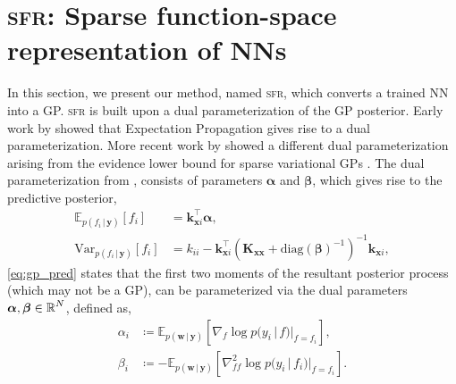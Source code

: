 \documentclass{article}
\renewcommand{\paragraph}[1]{{\bf #1}~~}
\newcommand{\our}{\textsc{sfr}\xspace}
\newcommand{\mathbold}[1]{\bm{#1}}
\newcommand{\mbf}[1]{\mathbf{#1}}
\renewcommand{\mid}{\,|\,}
\newcommand{\valpha}[0]{\mathbold{\alpha}}
\newcommand{\vbeta}[0]{\mathbold{\beta}}
\newcommand{\diag}{\text{{diag}}}
\newcommand{\vx}{\mbf{x}}
\newcommand{\vy}{\mbf{y}}
\newcommand{\vw}{\mbf{w}}
\newcommand{\MKxx}{\mbf{K}_{\mbf{x}\mbf{x}}}
\newcommand{\vk}{\mbf{k}}
\newcommand{\myexpect}{\mathbb{E}}
\begin{document}
\section{\our: Sparse function-space representation of NNs}\label{sec:sfr}
In this section, we present our method, named \our, which converts a trained NN into a GP.
\our is built upon a dual parameterization of the GP posterior.
Early work by \citet{csato2002sparse} showed that Expectation Propagation gives rise to a dual parameterization.
More recent work by \citet{adam2021dual,chang2023memory} showed a different dual parameterization arising from the evidence lower bound for sparse variational GPs \citep{hensman2013gaussian,titsias2009variational}.
The dual parameterization from \citet{adam2021dual,chang2023memory}, consists of parameters $\valpha$ and $\vbeta$, which gives rise to the predictive posterior,
\begin{subequations}  \label{eq:gp_pred}
\begin{align}
  \myexpect_{p(f_i \mid\vy)}[f_i] &= \vk_{\vx i}^\top \valpha, \\
  \mathrm{Var}_{p(f_i \mid \vy)}[f_i] &= k_{ii} - \vk_{\vx i}^\top ( \MKxx + \diag(\vbeta)^{-1})^{-1} \vk_{\vx i},  \nonumber
\end{align}
\end{subequations}
%
\cref{eq:gp_pred} states that the first two moments of the resultant posterior process (which may not be a GP), can be parameterized via the dual
parameters $\valpha, \vbeta \in \R^{N}$,
defined as, 
%
\begin{subequations}
\label{eq:dual_param}
\begin{align}
  \alpha_i &\coloneqq \myexpect_{p(\vw \mid \vy)}[\nabla_{f}\log p(y_i \mid f) |_{f=f_i}], \\
  \beta_i &\coloneqq - \myexpect_{p(\vw \mid \vy)}[\nabla^2_{f f}\log p(y_i \mid f_i) |_{f=f_i}].
  \end{align}
\end{subequations}
\end{document}
